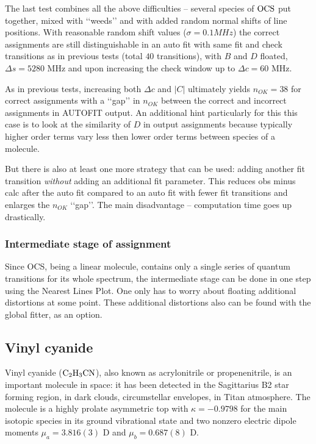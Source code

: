 \documentclass[11pt]{article}
\begin{document}
The last test combines all the above difficulties -- several species of $\rm OCS$ put together, mixed with \lq\lq{}weeds\rq\rq{} and with added random normal shifts of line positions. With reasonable random shift values ($\sigma = 0.1 MHz$) the correct assignments are still distinguishable in an auto fit with same fit and check transitions as in previous tests (total $40$ transitions), with $B$ and $D$ floated, $\Delta s = 5280$ MHz and upon increasing the check window up to $\Delta c = 60$ MHz. 

As in previous tests, increasing both $\Delta c$ and $|C|$ ultimately yields $n_{OK} = 38$ for correct assignments with a  \lq\lq{}gap\rq\rq{} in $n_{OK}$ between the correct and incorrect assignments in AUTOFIT output. An additional hint particularly for this this case is to look at the similarity of $D$ in output assignments because typically higher order terms vary less then lower order terms between species of a molecule.

But there is also at least one more strategy that can be used: adding another fit transition \emph{without} adding an additional fit parameter. This reduces obs minus calc after the auto fit compared to an auto fit with fewer fit transitions and enlarges the $n_{OK}$ \lq\lq{}gap\rq\rq{}. The main disadvantage -- computation time goes up drastically. %



\subsubsection{Intermediate stage of assignment}

Since OCS, being a linear molecule, contains only a single series of quantum transitions for its whole spectrum, the intermediate stage can be done in one step using the Nearest Lines Plot. One only has to worry about floating additional distortions at some point. These additional distortions also can be found with the global fitter, as an option.

\subsection{Vinyl cyanide}

Vinyl cyanide ($\rm C_2H_3CN$), also known as acrylonitrile or propenenitrile, is an important molecule in space: it has been detected in the Sagittarius B2 star forming region, in dark clouds, circumstellar envelopes, in Titan atmosphere. The molecule is a highly prolate asymmetric top with $\kappa = -0.9798$ for the main isotopic species in its ground vibrational state and two nonzero electric dipole moments $\mu_a = 3.816(3)$ D and $\mu_b = 0.687(8)$ D.  
\end{document}
